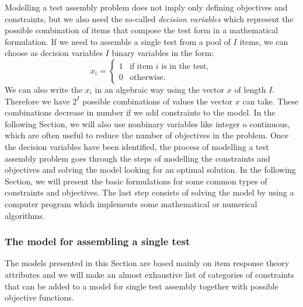 Modelling a test assembly problem does not imply only defining objectives and constraints, but we also need the so-called \emph{decision variables} which represent the possible combination of items that compose the test form in a mathematical formulation. If we need to assemble a single test from a pool of $I$ items, we can choose as decision variables $I$ binary variables in the form:
\begin{equation*}\label{eq:optvar}
x_{i}=
\begin{cases}
1 & \mbox{if item }i \mbox{ is in the test},\\
0 & \mbox{otherwise}.
\end{cases}
\end{equation*}
We can also write the $x_i$ in an algebraic way using the vector $x$ of length $I$. Therefore we have $2^I$ possible combinations of values the vector $x$ can take. These combinations decrease in number if we add constraints to the model. In the following Section, we will also use nonbinary variables like integer o continuous, which are often useful to reduce the number of objectives in the problem. Once the decision variables have been identified, the process of modelling a test assembly problem goes through the steps of modelling the constraints and objectives and solving the model looking for an optimal solution.
In the following Section, we will present the basic formulations for some common types of constraints and objectives. The last step consists of solving the model by using a computer program which implements some mathematical or numerical algorithms.

\subsubsection{The model for assembling a single test}
The models presented in this Section are based mainly on item response theory attributes and we will make an almost exhaustive list of categories of constraints that can be added to a model for single test assembly together with possible objective functions.

